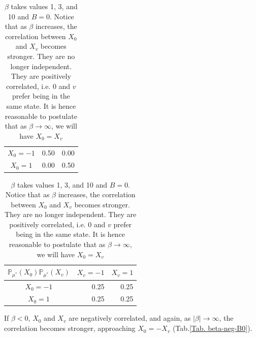\documentclass[12pt]{article}
\begin{document}
\begin{table}[h]
\begin{tabular}{c|rr}
        $X_0=-1$                       & 0.50                         & 0.00                        \\
        $X_0=1$                        & 0.00                         & 0.50
    \end{tabular}
    \quad\quad
    \begin{tabular}{c|rr}
        $\mathbb{P}_{\mu^*}(X_0)\mathbb{P}_{\mu^*}(X_v)$ & \multicolumn{1}{c}{$X_v=-1$} & \multicolumn{1}{c}{$X_v=1$} \\ \hline
        $X_0=-1$                                         & 0.25                         & 0.25                        \\
        $X_0=1$                                          & 0.25                         & 0.25
    \end{tabular}
    \caption{$\beta$ takes values 1, 3, and 10 and $B=0$. Notice that
        as $\beta$ increases, the correlation between $X_0$ and $X_v$ becomes stronger. They are no longer independent. They are positively correlated, i.e. $0$ and $v$ prefer being in the same
        state. It is hence reasonable to postulate that as $\beta\rightarrow\infty$, we will have $X_0=X_v$}
    \label{Tab. beta-higher-B0}
\end{table}

\noindent If $\beta < 0$, $X_0$ and $X_v$ are negatively correlated, and again, as $|\beta|\rightarrow \infty$, the correlation becomes stronger,
approaching $X_0=-X_v$ (Tab.\ref{Tab. beta-neg-B0}).
\end{document}
